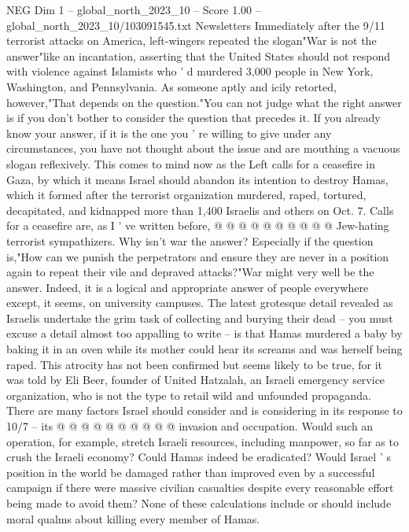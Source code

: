\begin{textsample}{NEG Dim 1 – global\_north\_2023\_10 – Score 1.00 – global\_north\_2023\_10/103091545.txt}  \label{ex:f1_neg_311}
Newsletters Immediately after the 9/11 terrorist attacks on America, left-wingers repeated the slogan"War is not the answer"like an incantation, asserting that the United States should not respond with violence against Islamists who ' d murdered 3,000 people in New York, Washington, and Pennsylvania.
As someone aptly and icily retorted, however,"That depends on the question."You can not judge what the right answer is if you don't bother to consider the question that precedes it.
If you already know your answer, if it is the one you ' re willing to give under any circumstances, you have not thought about the issue and are mouthing a vacuous slogan reflexively.
This comes to mind now as the Left calls for a ceasefire in Gaza, by which it means Israel should abandon its intention to destroy Hamas, which it formed after the terrorist organization murdered, raped, tortured, decapitated, and kidnapped more than 1,400 Israelis and others on Oct. 7.
Calls for a ceasefire are, as I ' ve written before, @ @ @ @ @ @ @ @ @ @ Jew-hating terrorist sympathizers.
Why isn't war the answer?
Especially if the question is,"How can we punish the perpetrators and ensure they are never in a position again to repeat their vile and depraved attacks?"War might very well be the answer.
Indeed, it is a logical and appropriate answer of people everywhere except, it seems, on university campuses.
The latest grotesque detail revealed as Israelis undertake the grim task of collecting and burying their dead -- you must excuse a detail almost too appalling to write -- is that Hamas murdered a baby by baking it in an oven while its mother could hear its screams and was herself being raped.
This atrocity has not been confirmed but seems likely to be true, for it was told by Eli Beer, founder of United Hatzalah, an Israeli emergency service organization, who is not the type to retail wild and unfounded propaganda.
There are many factors Israel should consider and is considering in its response to 10/7 -- its @ @ @ @ @ @ @ @ @ @ invasion and occupation.
Would such an operation, for example, stretch Israeli resources, including manpower, so far as to crush the Israeli economy?
Could Hamas indeed be eradicated?
Would Israel ' s position in the world be damaged rather than improved even by a successful campaign if there were massive civilian casualties despite every reasonable effort being made to avoid them?
None of these calculations include or should include moral qualms about killing every member of Hamas.

\end{textsample}
